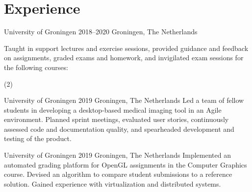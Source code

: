 \section*{Experience}

{University of Groningen} %
{2018--2020} %
{Groningen, The Netherlands} %
{%
	Taught in support lectures and exercise sessions, provided guidance and feedback on assignments, graded exams and homework, and invigilated exam sessions for the following courses:
	\begin{tasks}[style=itemize](2)
	\end{tasks}
}

{University of Groningen} %
{2019} %
{Groningen, The Netherlands} %
{%
	Led a team of fellow students in developing a desktop-based medical imaging tool in an Agile environment. Planned sprint meetings, evaluated user stories, continuously assessed code and documentation quality, and spearheaded development and testing of the product.
}

{University of Groningen} %
{2019} %
{Groningen, The Netherlands} %
{
	Implemented an automated grading platform for OpenGL assignments in the Computer Graphics course. Devised an algorithm to compare student submissions to a reference solution. Gained experience with virtualization and distributed systems.
}
